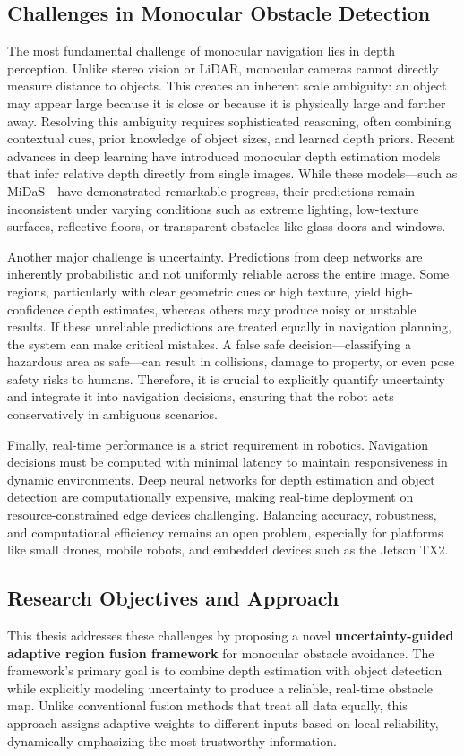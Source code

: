 \documentclass[12pt,oneside]{book}
\begin{document}
\subsection{Challenges in Monocular Obstacle Detection}
The most fundamental challenge of monocular navigation lies in depth perception. Unlike stereo vision or LiDAR, monocular cameras cannot directly measure distance to objects. This creates an inherent scale ambiguity: an object may appear large because it is close or because it is physically large and farther away. Resolving this ambiguity requires sophisticated reasoning, often combining contextual cues, prior knowledge of object sizes, and learned depth priors. Recent advances in deep learning have introduced monocular depth estimation models that infer relative depth directly from single images. While these models—such as MiDaS—have demonstrated remarkable progress, their predictions remain inconsistent under varying conditions such as extreme lighting, low-texture surfaces, reflective floors, or transparent obstacles like glass doors and windows.

Another major challenge is uncertainty. Predictions from deep networks are inherently probabilistic and not uniformly reliable across the entire image. Some regions, particularly with clear geometric cues or high texture, yield high-confidence depth estimates, whereas others may produce noisy or unstable results. If these unreliable predictions are treated equally in navigation planning, the system can make critical mistakes. A false safe decision—classifying a hazardous area as safe—can result in collisions, damage to property, or even pose safety risks to humans. Therefore, it is crucial to explicitly quantify uncertainty and integrate it into navigation decisions, ensuring that the robot acts conservatively in ambiguous scenarios.

Finally, real-time performance is a strict requirement in robotics. Navigation decisions must be computed with minimal latency to maintain responsiveness in dynamic environments. Deep neural networks for depth estimation and object detection are computationally expensive, making real-time deployment on resource-constrained edge devices challenging. Balancing accuracy, robustness, and computational efficiency remains an open problem, especially for platforms like small drones, mobile robots, and embedded devices such as the Jetson TX2.


\subsection{Research Objectives and Approach}
This thesis addresses these challenges by proposing a novel \textbf{uncertainty-guided adaptive region fusion framework} for monocular obstacle avoidance. The framework’s primary goal is to combine depth estimation with object detection while explicitly modeling uncertainty to produce a reliable, real-time obstacle map. Unlike conventional fusion methods that treat all data equally, this approach assigns adaptive weights to different inputs based on local reliability, dynamically emphasizing the most trustworthy information.
\end{document}
